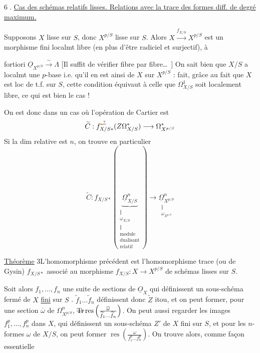 \textcircled{6.} \uline{Cas des schémas relatifs lisses. Relations avec la trace des formes diff. de degré maximum.}

Supposons $X$ lisse sur $S$, donc $X^{p/S}$ lisse sur $S$. Alors $X\xrightarrow{f_{X/S}}X^{p/S}$ est un morphisme fini localmt libre (en plus d'être radiciel et surjectif), à

fortiori $\underline O_{X^{p/S}}\xrightarrow{\sim}\Lambda$  [Il suffit de vérifier fibre par fibre\ldots\ ] On sait bien que $X/S$ a localmt une $p$-base i.e. qu'il en est ainsi de $X$ sur $X^{p/S}$ :  fait, grâce au fait que $X$ est loc de t.f. sur $S$, cette condition équivaut à celle que $\Omega^1_{X/S}$ soit localement libre, ce qui est bien le cas !

On est donc dans un cas où l'opération de Cartier est
\[
 \widetilde C:f_{X/S*}^{\deleted{\unsure{*}}}(Z\Omega^*_{X/S})\longrightarrow\Omega^*_{X^{p/S}}
\]
Si la dim relative est $n$, on trouve en particulier
\[
 \widetilde C:f_{X/S*}(\underbrace{\underline\Omega^n_{X/S}}_{
 \substack{\Vert\\\omega_{X/S}\\\Vert\\\text{module}\\\text{dualisant}\\\text{relatif}}})
 \longrightarrow\underset{\substack{\Vert\\\omega_{X^{p/S}}}}{\underline\Omega^n_{X^{p/S}}}
\]

\uline{Théorème} 3\quad L'homomorphisme précédent est l'homomorphisme trace (ou de Gysin) $f_{X/S*}$ associé au morphisme $f_{X/S}:X\longrightarrow X^{p/S}$ de schémas lisses sur $S$.

Soit alors $f_1,\ldots,f_n$ une suite de sections de $\underline O_X$ qui définissent un sous-schéma fermé  de $X$ \uline{fini} sur $S$ . $\widetilde f_1\ldots\widetilde f_n$ définissent donc $\widetilde Z$ itou, et on peut former, pour une section $\overline\omega$ de $\Omega^n_{X^{p/S}}$, $\deleted{\operatorname{Tr}}\operatorname{res}\left(\frac{\overline\omega}{\widetilde f_1\ldots\widetilde f_n}\right)$. On peut aussi regarder les images $f_1^p,\ldots,f_n^p$ dans $X$, qui définissent un sous-schéma $Z'$ de $X$ fini sur $S$, et pour les $n$-formes $\omega$ de $X/S$, on peut former $\operatorname{res}\left(\frac{\omega}{f_1^p\ldots f_n^p}\right)$. On trouve alors, comme façon essentielle

